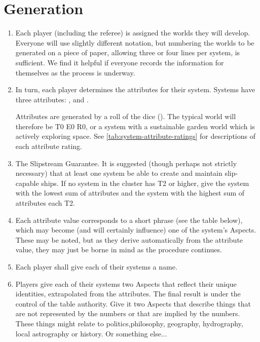 \iflandscape{}{\vfil}
\section{Generation}\label{sec:Generation} %

\begin{enumerate}
\item Each player (including the referee) is assigned the worlds they will develop. Everyone will use slightly different notation, but numbering the worlds to be generated on a piece of paper, allowing three or four lines per system, is sufficient. We find it helpful if everyone records the information for themselves as the process is underway.

\item In turn, each player determines the attributes for their system. Systems have three attributes:
,  and .

%

Attributes are generated by a roll of the dice (\dF). The typical world will therefore be T0 E0 R0, or a system with a sustainable garden world which is actively exploring space. See \autoref{tab:system-attribute-ratings} for descriptions of each attribute rating.

\item The Slipstream Guarantee. It is suggested (though perhaps not strictly necessary) that at least one system be able to create and maintain slip-capable ships. If no system in the cluster has T2 or higher, give the system with the lowest sum of attributes and the system with the highest sum of attributes each T2.

\item Each attribute value corresponds to a short phrase (see the table below), which may become (and will certainly influence) one of the system's Aspects. These may be noted, but as they derive automatically from the attribute value, they may just be borne in mind as the procedure continues.

\item Each player shall give each of their systems a name.

\item Players give each of their systems two Aspects that reflect their unique identities, extrapolated from the attributes. The final result is under the control of the table authority. Give it two Aspects that describe things that are not represented by the numbers or that are implied by the numbers. These things might relate to politics,philosophy, geography, hydrography, local astrography or history. Or something else...


\end{enumerate}
